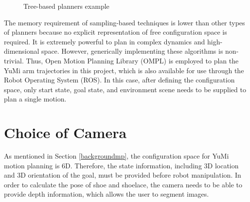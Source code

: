\begin{figure}[H]
\centering
{}
\caption{Tree-based planners example \citep{OMPLPrim20:online}}
\label{tree}
\end{figure}

The memory requirement of sampling-based techniques is lower than other types of planners because no explicit representation of free configuration space is required. It is extremely powerful to plan in complex dynamics and high-dimensional space. However, generically implementing these algorithms is non-trivial. Thus, Open Motion Planning Library (OMPL) \citep{OMPL} is employed to plan the YuMi arm trajectories in this project, which is also available for use through the Robot Operating System (ROS).
In this case, after defining the configuration space, only start state, goal state, and environment scene needs to be supplied to plan a single motion. 

\section{Choice of Camera}
As mentioned in Section \ref{backgroundmp}, the configuration space for YuMi motion planning is 6D. Therefore, the state information, including 3D location and 3D orientation of the goal, must be provided before robot manipulation. In order to calculate the pose of shoe and shoelace, the camera needs to be able to provide depth information, which allows the user to segment images. 

